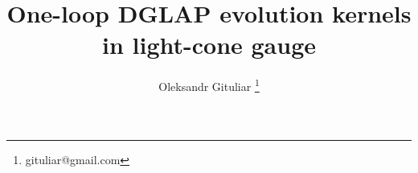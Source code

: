 \documentclass[10pt,pagesize,paper=A4]{scrartcl}
\begin{document}
  \lstset{                          %
    basicstyle=\small\ttfamily,     %
    numbers=left,                   %
    numbersep=1pt,                  %
    numberstyle=\ttfamily           %
  }

  \author{Oleksandr Gituliar \thanks{gituliar@gmail.com}}
  \title{One-loop DGLAP evolution kernels in light-cone gauge}

  \maketitle

  

  \tableofcontents

  
  
  
\end{document}
